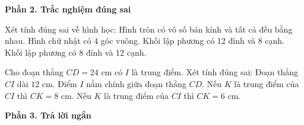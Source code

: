 \textbf{Phần 2. Trắc nghiệm đúng sai}

\begin{ex} %
Xét tính đúng sai về hình học:
\choiceTF
{\True Hình tròn có vô số bán kính và tất cả đều bằng nhau.}
{\True Hình chữ nhật có 4 góc vuông.}
{Khối lập phương có 12 đỉnh và 8 cạnh.}
{\True Khối lập phương có 8 đỉnh và 12 cạnh.}
\end{ex}

\begin{ex} %
Cho đoạn thẳng $CD = 24\text{ cm}$ có $I$ là trung điểm. Xét tính đúng sai:
\choiceTF
{\True Đoạn thẳng $CI$ dài $12\text{ cm}$.}
{\True Điểm $I$ nằm chính giữa đoạn thẳng $CD$.}
{Nếu $K$ là trung điểm của $CI$ thì $CK = 8\text{ cm}$.}
{\True Nếu $K$ là trung điểm của $CI$ thì $CK = 6\text{ cm}$.}
\end{ex}

\textbf{Phần 3. Trả lời ngắn}

